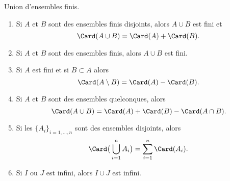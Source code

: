 \begin{lemma}       \label{LEMooVFPNooVmdUXY}
    Union d'ensembles finis.
    \begin{enumerate}
\item       \label{ITEMooBUCZooYLCuIe}
    Si \( A\) et \( B\) sont des ensembles finis disjoints, alors \( A\cup B\) est fini et
    \begin{equation}
        \Card(A\cup B)=\Card(A) + \Card(B).
    \end{equation}
        \item       \label{ITEMooCCWOooYwgGBp}
    Si \( A\) et \( B\) sont des ensembles finis, alors \( A\cup B\) est fini.
\item       \label{ITEMooYJSZooXQXkOX}
    Si \( A\) est fini et si \( B\subset A\) alors
    \begin{equation}
        \Card(A\setminus B)=\Card(A)-\Card(B).
    \end{equation}
\item       \label{ITEMooSWJCooEpBVkG}
    Si \( A\) et \( B\) sont des ensembles quelconques, alors
    \begin{equation}
        \Card(A\cup B)=\Card(A)+\Card(B)-\Card(A\cap B).
    \end{equation}
\item       \label{ITEMooJDUUooVMvAOn}
    Si les \( \{ A_i \}_{i=1,\ldots, n}\) sont des ensembles disjoints, alors
    \begin{equation}
        \Card\big( \bigcup_{i=1}^nA_i \big)=\sum_{i=1}^n\Card(A_i).
    \end{equation}
\item \label{ITEMooNMFSooBvsNyq}
    Si \( I\) ou \( J\) est infini, alors \( I \cup J\) est infini.
    \end{enumerate}
\end{lemma}

